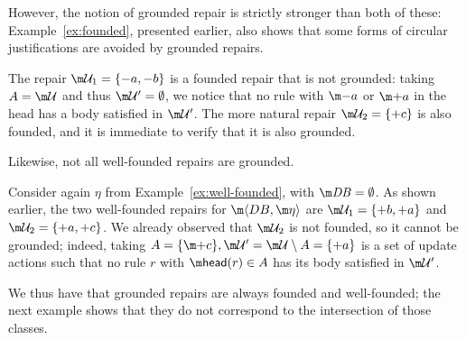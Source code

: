 However, the notion of grounded repair is strictly stronger than both of these: Example~\ref{ex:founded}, presented earlier, also shows that some forms of circular justifications are avoided by grounded repairs.
\begin{example}
  \label{ex:founded-gr}
  The repair $\UU_1=\{-a,-b\}$ is a founded repair that is not grounded: taking $A = \UU$ and thus $\UU'=\emptyset$, we notice that no rule with $\remove a$ or $\add a $ in the head has a body satisfied in $\UU'$. %
  The more natural repair $\UU_2=\{+c\}$ is also founded, and it is immediate to verify that it is also grounded.
\end{example}


Likewise, not all well-founded repairs are grounded. %
\begin{example}
  Consider again $\eta$ from Example~\ref{ex:well-founded}, with $\db=\emptyset$.
  As shown earlier, the two well-founded repairs for $\fulldb$ are $\UU_1=\{{+b},{+a}\}$ and $\UU_2=\{{+a},{+c}\}$.
  We already observed that $\UU_2$ is not founded, so it cannot be grounded; indeed, taking $A = \{\add c\}, \UU'=\UU\setminus A = \{{+a}\}$ is a set of update actions such that no rule $r$ with $\head(r)\in A$ has its body satisfied in $\UU'$. %
\end{example}



We thus have that grounded repairs are always founded and well-founded; the next example shows that they do not correspond to the intersection of those classes.

